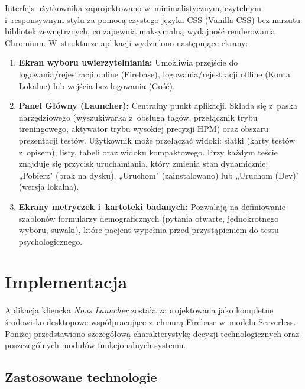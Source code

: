 \documentclass[12pt, a4paper, oneside]{report}
\begin{document}
Interfejs użytkownika zaprojektowano w~minimalistycznym, czytelnym i~responsywnym stylu za pomocą czystego języka CSS (Vanilla CSS) bez narzutu bibliotek zewnętrznych, co zapewnia maksymalną wydajność renderowania Chromium. W~strukturze aplikacji wydzielono następujące ekrany:
\begin{enumerate}
	\item \textbf{Ekran wyboru uwierzytelniania:} Umożliwia przejście do logowania/rejestracji online (Firebase), logowania/rejestracji offline (Konta Lokalne) lub wejścia bez logowania (Gość).
	\item \textbf{Panel Główny (Launcher):} Centralny punkt aplikacji. Składa się z~paska narzędziowego (wyszukiwarka z~obsługą tagów, przełącznik trybu treningowego, aktywator trybu wysokiej precyzji HPM) oraz obszaru prezentacji testów. Użytkownik może przełączać widoki: siatki (karty testów z~opisem), listy, tabeli oraz widoku kompaktowego. Przy każdym teście znajduje się przycisk uruchamiania, który zmienia stan dynamicznie: „Pobierz" (brak na dysku), „Uruchom" (zainstalowano) lub „Uruchom (Dev)" (wersja lokalna).
	\item \textbf{Ekrany metryczek i~kartoteki badanych:} Pozwalają na definiowanie szablonów formularzy demograficznych (pytania otwarte, jednokrotnego wyboru, suwaki), które pacjent wypełnia przed przystąpieniem do testu psychologicznego.
\end{enumerate}


\section{Implementacja}
\label{sec:implementacja}

Aplikacja kliencka \textit{Nous Launcher} została zaprojektowana jako kompletne środowisko desktopowe współpracujące z~chmurą Firebase w~modelu Serverless. Poniżej przedstawiono szczegółową charakterystykę decyzji technologicznych oraz poszczególnych modułów funkcjonalnych systemu.

\subsection{Zastosowane technologie}
\label{subsec:technologie}
\end{document}
